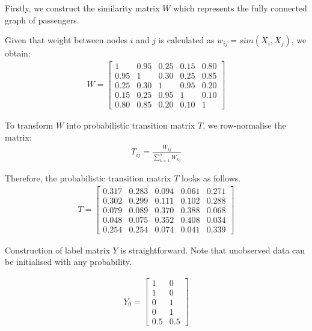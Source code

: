\begin{example}
    Firstly, we construct the similarity matrix $W$ which represents the fully connected graph of passengers.
    
    Given that weight between nodes $i$ and $j$ is calculated as $w_{ij} = sim(X_i, X_j)$, we obtain:
    \begin{align*}
        W = 
        \begin{bmatrix}
            1    & 0.95 & 0.25 & 0.15 & 0.80 \\
            0.95 & 1    & 0.30 & 0.25 & 0.85 \\
            0.25 & 0.30 & 1    & 0.95 & 0.20 \\
            0.15 & 0.25 & 0.95 & 1    & 0.10 \\
            0.80 & 0.85 & 0.20 & 0.10 & 1
        \end{bmatrix}
    \end{align*}
    
    To transform $W$ into probabilistic transition matrix $T$, we row-normalise the matrix:
    \begin{align*}
        T_{ij} = \frac{W_{ij}}{\sum_{k=1}^{5}W_{kj}}
    \end{align*}
    
    Therefore, the probabilistic transition matrix $T$ looks as follows.
    \begin{align*}
        T = 
        \begin{bmatrix}
            0.317 & 0.283 & 0.094 & 0.061 & 0.271 \\
            0.302 & 0.299 & 0.111 & 0.102 & 0.288 \\
            0.079 & 0.089 & 0.370 & 0.388 & 0.068 \\
            0.048 & 0.075 & 0.352 & 0.408 & 0.034 \\
            0.254 & 0.254 & 0.074 & 0.041 & 0.339
        \end{bmatrix}
    \end{align*}
    
    Construction of label matrix $Y$ is straightforward. Note that unobserved data can be initialised with any probability.
    
    \begin{align*}
        Y_0 = 
        \begin{bmatrix}
            1   & 0 \\
            1   & 0 \\
            0   & 1 \\
            0   & 1 \\
            0.5 & 0.5 
        \end{bmatrix}
    \end{align*}
    

\end{example}
